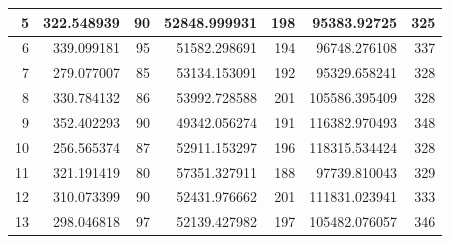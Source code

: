\begin{table}
\begin{adjustwidth}{}{}
{{\begin{tabular}{|r|r|r|r|r|r|r|}
	\hline
	5                                          & 322.548939                   & 90                                    & 52848.999931                   & 198                                   & 95383.92725                  & 325                                    \\ 
	\hline
	6                                          & 339.099181                   & 95                                    & 51582.298691                   & 194                                   & 96748.276108                 & 337                                    \\ 
	\hline
	7                                          & 279.077007                   & 85                                    & 53134.153091                   & 192                                   & 95329.658241                 & 328                                    \\ 
	\hline
	8                                          & 330.784132                   & 86                                    & 53992.728588                   & 201                                   & 105586.395409                & 328                                    \\ 
	\hline
	9                                          & 352.402293                   & 90                                    & 49342.056274                   & 191                                   & 116382.970493                & 348                                    \\ 
	\hline
	10                                         & 256.565374                   & 87                                    & 52911.153297                   & 196                                   & 118315.534424                & 328                                    \\ 
	\hline
	11                                         & 321.191419                   & 80                                    & 57351.327911                   & 188                                   & 97739.810043                 & 329                                    \\ 
	\hline
	12                                         & 310.073399                   & 90                                    & 52431.976662                   & 201                                   & 111831.023941                & 333                                    \\ 
	\hline
	13                                         & 298.046818                   & 97                                    & 52139.427982                   & 197                                   & 105482.076057                & 346                                    \\ 

\end{tabular}}}
\end{adjustwidth}
\end{table}
